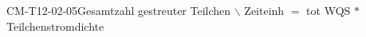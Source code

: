 
\begin{CONC}{CM-T12-02-05}{Gesamtzahl gestreuter Teilchen $\backslash$ Zeiteinh $=$ tot WQS $*$ Teilchenstromdichte}
\end{CONC}

